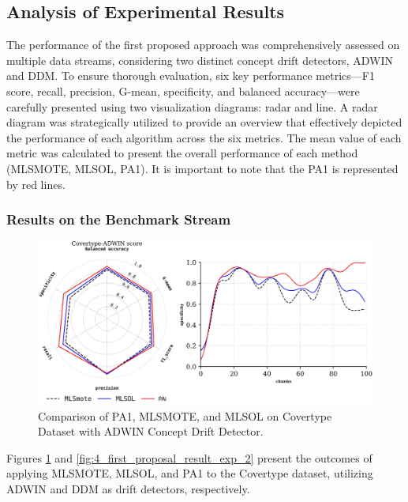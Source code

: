 \subsection{Analysis of Experimental Results}
The performance of the first proposed approach was comprehensively assessed on multiple data streams, considering two distinct concept drift detectors, ADWIN and DDM. To ensure thorough evaluation, six key performance metrics—F1 score, recall, precision, G-mean, specificity, and balanced accuracy—were carefully presented using two visualization diagrams: radar and line. A radar diagram was strategically utilized to provide an overview that effectively depicted the performance of each algorithm across the six metrics. The mean value of each metric was calculated to present the overall performance of each method (MLSMOTE, MLSOL, PA1). It is important to note that the PA1 is represented by red lines.

\subsubsection{Results on the Benchmark Stream}
\vspace{-3mm}
\begin{figure}[H]
	\centering
	\includegraphics[width=1\linewidth]{4_Imbalanced/figures/exp_1.png}
	\caption{Comparison of PA1, MLSMOTE, and MLSOL on Covertype Dataset with ADWIN Concept Drift Detector.}
	\label{fig:4_first_proposal_result_exp_1}
\end{figure}
Figures \ref{fig:4_first_proposal_result_exp_1} and \ref{fig:4_first_proposal_result_exp_2} present the outcomes of applying MLSMOTE, MLSOL, and PA1 to the Covertype dataset, utilizing ADWIN and DDM as drift detectors, respectively.

